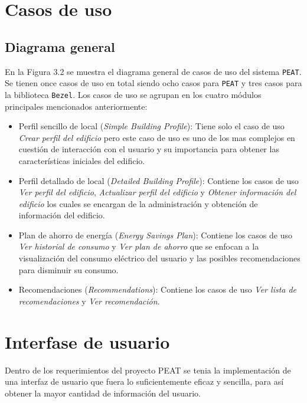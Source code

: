 \section{Casos de uso}

\subsection{Diagrama general}

En la Figura 3.2 se muestra el diagrama general de casos de uso del sistema
\texttt{PEAT}. Se tienen once casos de uso en total siendo ocho casos para
\texttt{PEAT} y tres casos para la biblioteca \texttt{Bezel}.
Los casos de uso se agrupan en los cuatro módulos principales mencionados
anteriormente:

\begin{itemize}
\item Perfil sencillo de local (\textit{Simple Building Profile}): Tiene
  solo el caso de uso \textit{Crear perfil del edificio} pero este caso de uso
  es uno de los mas complejos en cuestión de interacción con el usuario y su
  importancia para obtener las características iniciales del edificio.
\item Perfil detallado de local (\textit{Detailed Building Profile}): Contiene
  los casos de uso \textit{Ver perfil del edificio},
  \textit{Actualizar perfil del edificio} y \textit{Obtener información del edificio}
  los cuales se encargan de la administración y obtención de información del
  edificio.
\item Plan de ahorro de energía (\textit{Energy Savings Plan}): Contiene los
  casos de uso \textit{Ver historial de consumo} y \textit{Ver plan de ahorro}
  que se enfocan a la visualización del consumo eléctrico del usuario y las
  posibles recomendaciones para disminuir su consumo.
\item Recomendaciones (\textit{Recommendations}): Contiene los casos de uso
  \textit{Ver lista de recomendaciones} y \textit{Ver recomendación}.
\end{itemize}


\section{Interfase de usuario}
Dentro de los requerimientos del proyecto PEAT se tenia la implementación de una
interfaz de usuario que fuera lo suficientemente eficaz y sencilla, para así obtener
la mayor cantidad de información del usuario.

